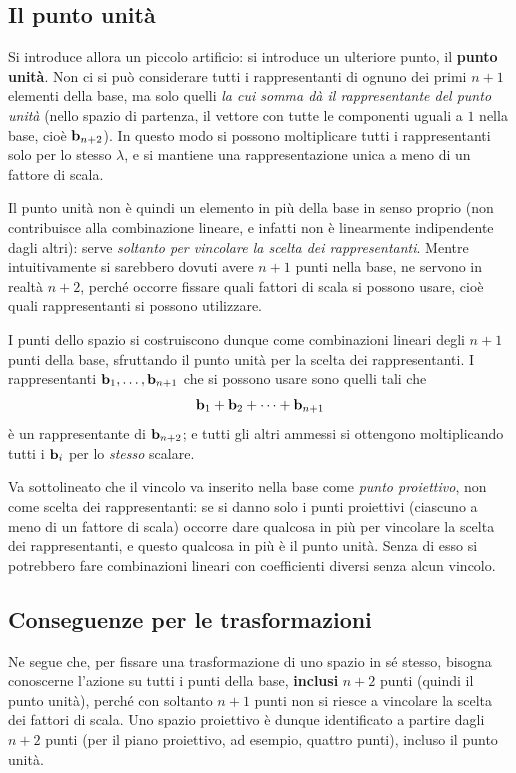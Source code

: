 \subsection{Il punto unità}

Si introduce allora un piccolo artificio: si introduce un ulteriore punto, il \textbf{punto unità}. Non ci si può considerare tutti i rappresentanti di ognuno dei primi $n+1$ elementi della base, ma solo quelli \emph{la cui somma dà il rappresentante del punto unità} (nello spazio di partenza, il vettore con tutte le componenti uguali a $1$ nella base, cioè $\mathbf{b}_{n+2}$). In questo modo si possono moltiplicare tutti i rappresentanti solo per lo stesso $\lambda$, e si mantiene una rappresentazione unica a meno di un fattore di scala.

Il punto unità non è quindi un elemento in più della base in senso proprio (non contribuisce alla combinazione lineare, e infatti non è linearmente indipendente dagli altri): serve \emph{soltanto per vincolare la scelta dei rappresentanti}. Mentre intuitivamente si sarebbero dovuti avere $n+1$ punti nella base, ne servono in realtà $n+2$, perché occorre fissare quali fattori di scala si possono usare, cioè quali rappresentanti si possono utilizzare.

I punti dello spazio si costruiscono dunque come combinazioni lineari degli $n+1$ punti della base, sfruttando il punto unità per la scelta dei rappresentanti. I rappresentanti $\mathbf{b}_1,\dots,\mathbf{b}_{n+1}$ che si possono usare sono quelli tali che
\[
  \mathbf{b}_1+\mathbf{b}_2+\dots+\mathbf{b}_{n+1}
\]
è un rappresentante di $\mathbf{b}_{n+2}$; e tutti gli altri ammessi si ottengono moltiplicando tutti i $\mathbf{b}_i$ per lo \emph{stesso} scalare.

Va sottolineato che il vincolo va inserito nella base come \emph{punto proiettivo}, non come scelta dei rappresentanti: se si danno solo i punti proiettivi (ciascuno a meno di un fattore di scala) occorre dare qualcosa in più per vincolare la scelta dei rappresentanti, e questo qualcosa in più è il punto unità. Senza di esso si potrebbero fare combinazioni lineari con coefficienti diversi senza alcun vincolo.

\subsection{Conseguenze per le trasformazioni}

Ne segue che, per fissare una trasformazione di uno spazio in sé stesso, bisogna conoscerne l'azione su tutti i punti della base, \textbf{inclusi} $n+2$ punti (quindi il punto unità), perché con soltanto $n+1$ punti non si riesce a vincolare la scelta dei fattori di scala. Uno spazio proiettivo è dunque identificato a partire dagli $n+2$ punti (per il piano proiettivo, ad esempio, quattro punti), incluso il punto unità.

